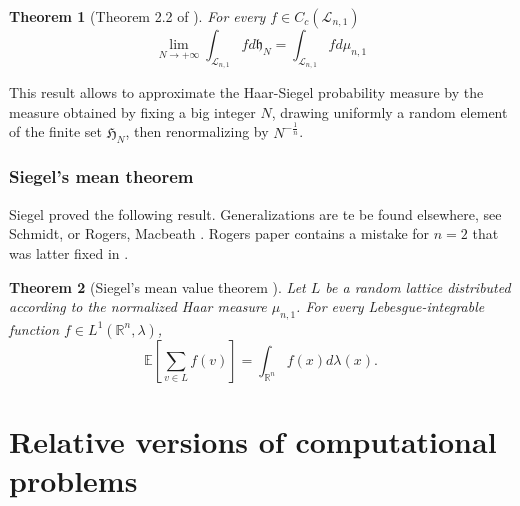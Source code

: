 \documentclass{article}
\newtheorem{theorem}{Theorem}
\begin{document}
\begin{theorem}[Theorem 2.2 of \cite{goldstein2003equidistribution}]
For every $f\in C_c(\mathcal L_{n,1})$
\[\lim_{N\rightarrow +\infty} \int_{\mathcal L_{n,1}} f d\mathfrak h_{N} = \int_{\mathcal L_{n,1}} fd\mu_{n,1}\]
\end{theorem}

This result allows to approximate the Haar-Siegel probability measure by the measure obtained by fixing a big integer $N$, drawing uniformly a random element of the finite set $\mathfrak H_N$, then renormalizing by $N^{-\frac{1}{n}}$.

\subsubsection{Siegel's mean theorem}

Siegel proved the following result. Generalizations are te be found elsewhere, see Schmidt, or Rogers, Macbeath  \cite{macbeath1958siegel}.
Rogers paper \cite{rogers1955mean} contains a mistake for $n=2$ that was latter fixed in \cite{schmidt1960metrical}.

\begin{theorem}[Siegel's mean value theorem \cite{siegel1945mean}]
Let $L$ be a random lattice distributed according to the normalized Haar measure $\mu_{n,1}$. For every Lebesgue-integrable function $f\in L^1(\mathbb R^{n},\lambda)$,
\[\mathbb E[\sum_{v\in L}f(v)] = \int_{\mathbb R^n}f(x) d\lambda(x).\]
\end{theorem}
\section{Relative versions of computational problems}%
\end{document}
